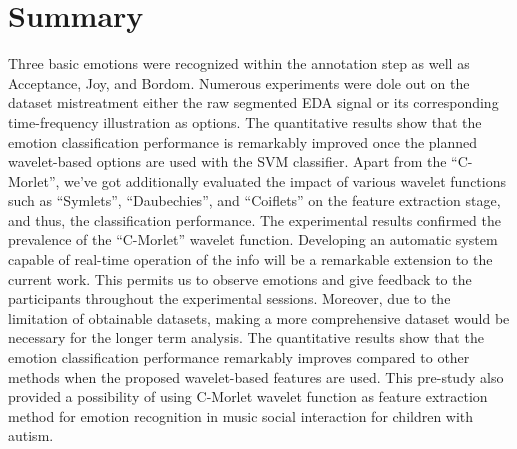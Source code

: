 \section{Summary}
Three basic emotions were recognized within the annotation step as well as Acceptance, Joy, 
and Bordom. Numerous experiments were dole out on the dataset mistreatment either the raw 
segmented EDA signal or its corresponding time-frequency illustration as options. 
The quantitative results show that the emotion classification performance is remarkably 
improved once the planned wavelet-based options are used with the SVM classifier. 
Apart from the “C-Morlet”, we've got additionally evaluated the impact of various wavelet functions such 
as “Symlets”, “Daubechies”, and “Coiflets” on the feature extraction stage, and thus, 
the classification performance. The experimental results confirmed the prevalence of 
the “C-Morlet” wavelet function. Developing an automatic system capable of real-time operation 
of the info will be a remarkable extension to the current work. This permits us to observe emotions 
and give feedback to the participants throughout the experimental sessions. Moreover, due to the 
limitation of obtainable datasets, making a more comprehensive dataset would be necessary 
for the longer term analysis. The quantitative results show that the emotion classification 
performance remarkably improves compared to other methods when the proposed wavelet-based features 
are used. This pre-study also provided a possibility of using C-Morlet wavelet function as feature 
extraction method for emotion recognition in music social interaction for children with autism.\\
 